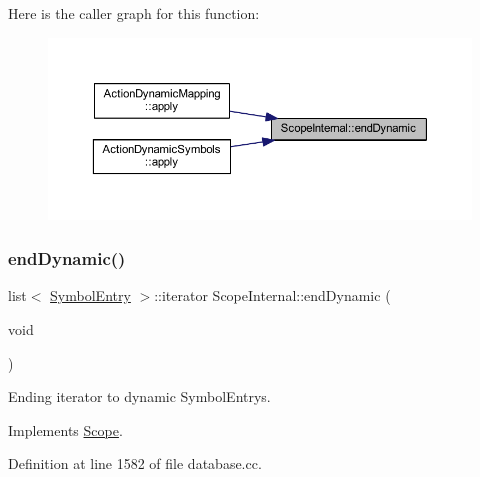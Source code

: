 Here is the caller graph for this function\+:
\nopagebreak
\begin{figure}[H]
\begin{center}
\leavevmode
\includegraphics[width=350pt]{class_scope_internal_ad1690a1aacfecff51b6d5832cccafd95_icgraph}
\end{center}
\end{figure}
\mbox{\label{class_scope_internal_a705f7003cbadcddbb621b951573c61e7}} 
\subsubsection{\texorpdfstring{endDynamic()}{endDynamic()}\hspace{0.1cm}{\footnotesize\ttfamily [2/2]}}
{\footnotesize\ttfamily list$<$ \mbox{\hyperlink{class_symbol_entry}{Symbol\+Entry}} $>$\+::iterator Scope\+Internal\+::end\+Dynamic (\begin{DoxyParamCaption}\item[{void}]{ }\end{DoxyParamCaption})\hspace{0.3cm}{\ttfamily [virtual]}}



Ending iterator to dynamic Symbol\+Entrys. 



Implements \mbox{\hyperlink{class_scope_a37c892157b9de825a3b475581fbf4019}{Scope}}.



Definition at line 1582 of file database.\+cc.

\mbox{\label{class_scope_internal_ac256d087718065edb1c3a96fbfdf7a33}} 
